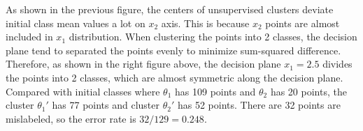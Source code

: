 \documentclass[12pt,a4paper]{article}
\begin{document}
    As shown in the previous figure, the centers of unsupervised clusters deviate initial class mean values a lot on $x_2$ axis. This is because $x_2$ points are almost included in $x_1$ distribution. When clustering the points into 2 classes, the decision plane tend to separated the points evenly to minimize sum-squared difference. Therefore, as shown in the right figure above, the decision plane $x_1=2.5$ divides the points into 2 classes, which are almost symmetric along the decision plane. Compared with initial classes where $\theta_1$ has 109 points and $\theta_2$ has 20 points, the cluster $\theta_1'$ has 77 points and cluster $\theta_2'$ has 52 points. There are 32 points are mislabeled, so the error rate is $32/129=0.248$. 
\end{document}
